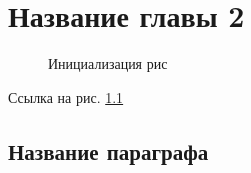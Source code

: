 \chapter{Название главы 2} \label{ch2}

\begin{figure}[H] 
	\center
	\caption{Инициализация рис}
	\label{fig:initial}
\end{figure}


Ссылка на рис. \ref{fig:initial}


\section{Название параграфа} \label{ch2:sec1}


